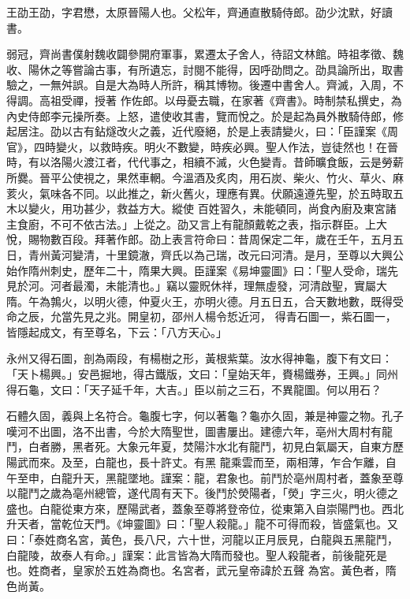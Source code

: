 
\begin{pinyinscope}

 王劭王劭，字君懋，太原晉陽人也。父松年，齊通直散騎侍郎。劭少沈默，好讀書。



 弱冠，齊尚書僕射魏收闢參開府軍事，累遷太子舍人，待詔文林館。時祖孝徵、魏收、陽休之等嘗論古事，有所遺忘，討閱不能得，因呼劭問之。劭具論所出，取書驗之，一無舛誤。自是大為時人所許，稱其博物。後遷中書舍人。齊滅，入周，不得調。高祖受禪，授著
 作佐郎。以母憂去職，在家著《齊書》。時制禁私撰史，為內史侍郎李元操所奏。上怒，遣使收其書，覽而悅之。於是起為員外散騎侍郎，修起居注。劭以古有鉆燧改火之義，近代廢絕，於是上表請變火，曰：「臣謹案《周官》，四時變火，以救時疾。明火不數變，時疾必興。聖人作法，豈徒然也！在晉時，有以洛陽火渡江者，代代事之，相續不滅，火色變青。昔師曠食飯，云是勞薪所爨。晉平公使視之，果然車輞。今溫酒及炙肉，用石炭、柴火、竹火、草火、麻荄火，氣味各不同。以此推之，新火舊火，理應有異。伏願遠遵先聖，於五時取五木以變火，用功甚少，救益方大。縱使
 百姓習久，未能頓同，尚食內廚及東宮諸主食廚，不可不依古法。」上從之。劭又言上有龍顏戴乾之表，指示群臣。上大悅，賜物數百段。拜著作郎。劭上表言符命曰：昔周保定二年，歲在壬午，五月五日，青州黃河變清，十里鏡澈，齊氏以為己瑞，改元曰河清。是月，至尊以大興公始作隋州刺史，歷年二十，隋果大興。臣謹案《易坤靈圖》曰：「聖人受命，瑞先見於河。河者最濁，未能清也。」竊以靈貺休祥，理無虛發，河清啟聖，實屬大隋。午為鶉火，以明火德，仲夏火王，亦明火德。月五日五，合天數地數，既得受命之辰，允當先見之兆。開皇初，邵州人楊令悊近河，
 得青石圖一，紫石圖一，皆隱起成文，有至尊名，下云：「八方天心。」



 永州又得石圖，剖為兩段，有楊樹之形，黃根紫葉。汝水得神龜，腹下有文曰：「天卜楊興。」安邑掘地，得古鐵版，文曰：「皇始天年，賚楊鐵券，王興。」同州得石龜，文曰：「天子延千年，大吉。」臣以前之三石，不異龍圖。何以用石？



 石體久固，義與上名符合。龜腹七字，何以著龜？龜亦久固，兼是神靈之物。孔子嘆河不出圖，洛不出書，今於大隋聖世，圖書屢出。建德六年，亳州大周村有龍鬥，白者勝，黑者死。大象元年夏，焚陽汴水北有龍鬥，初見白氣屬天，自東方歷陽武而來。及至，白龍也，長十許丈。有黑
 龍乘雲而至，兩相薄，乍合乍離，自午至申，白龍升天，黑龍墜地。謹案：龍，君象也。前鬥於亳州周村者，蓋象至尊以龍鬥之歲為亳州總管，遂代周有天下。後鬥於熒陽者，「熒」字三火，明火德之盛也。白龍從東方來，歷陽武者，蓋象至尊將登帝位，從東第入自崇陽門也。西北升天者，當乾位天門。《坤靈圖》曰：「聖人殺龍。」龍不可得而殺，皆盛氣也。又曰：「泰姓商名宮，黃色，長八尺，六十世，河龍以正月辰見，白龍與五黑龍鬥，白龍陵，故泰人有命。」謹案：此言皆為大隋而發也。聖人殺龍者，前後龍死是也。姓商者，皇家於五姓為商也。名宮者，武元皇帝諱於五聲
 為宮。黃色者，隋色尚黃。




\end{pinyinscope}
